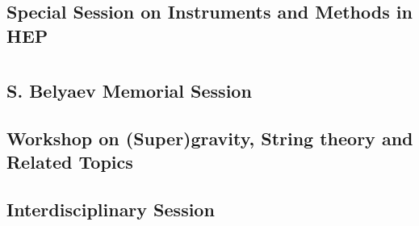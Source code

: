 \section{}
\subsection{Special Session on Instruments and Methods in HEP}

\clearpage

\section{}
\subsection{S. Belyaev Memorial Session}

\clearpage

\subsection{Workshop on (Super)gravity, String theory and Related Topics}

\clearpage

\subsection{Interdisciplinary Session}

\clearpage


